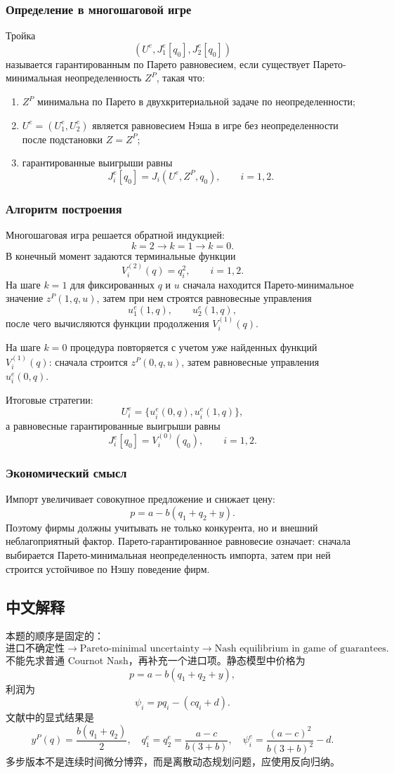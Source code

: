 \documentclass[12pt,a4paper]{article}
\begin{document}
\subsubsection{Определение в многошаговой игре}
Тройка
\[
(U^e,J_1^e[q_0],J_2^e[q_0])
\]
называется гарантированным по Парето равновесием, если существует Парето-минимальная неопределенность $Z^P$, такая что:
\begin{enumerate}
  \item $Z^P$ минимальна по Парето в двухкритериальной задаче по неопределенности;
  \item $U^e=(U_1^e,U_2^e)$ является равновесием Нэша в игре без неопределенности после подстановки $Z=Z^P$;
  \item гарантированные выигрыши равны
  \[
  J_i^e[q_0]=J_i(U^e,Z^P,q_0),\qquad i=1,2.
  \]
\end{enumerate}

\subsubsection{Алгоритм построения}
Многошаговая игра решается обратной индукцией:
\[
k=2\rightarrow k=1\rightarrow k=0.
\]
В конечный момент задаются терминальные функции
\[
V_i^{(2)}(q)=q_i^2,
\qquad i=1,2.
\]
На шаге $k=1$ для фиксированных $q$ и $u$ сначала находится Парето-минимальное значение $z^P(1,q,u)$, затем при нем строятся равновесные управления
\[
u_1^e(1,q),\qquad u_2^e(1,q),
\]
после чего вычисляются функции продолжения $V_i^{(1)}(q)$.

На шаге $k=0$ процедура повторяется с учетом уже найденных функций $V_i^{(1)}(q)$: сначала строится $z^P(0,q,u)$, затем равновесные управления $u_i^e(0,q)$.

Итоговые стратегии:
\[
U_i^e=\{u_i^e(0,q),u_i^e(1,q)\},
\]
а равновесные гарантированные выигрыши равны
\[
J_i^e[q_0]=V_i^{(0)}(q_0),\qquad i=1,2.
\]

\subsubsection{Экономический смысл}
Импорт увеличивает совокупное предложение и снижает цену:
\[
p=a-b(q_1+q_2+y).
\]
Поэтому фирмы должны учитывать не только конкурента, но и внешний неблагоприятный фактор. Парето-гарантированное равновесие означает: сначала выбирается Парето-минимальная неопределенность импорта, затем при ней строится устойчивое по Нэшу поведение фирм.

\subsection{中文解释}
本题的顺序是固定的：
\[
\text{进口不确定性} \rightarrow \text{Pareto-minimal uncertainty} \rightarrow \text{Nash equilibrium in game of guarantees}.
\]
不能先求普通 Cournot Nash，再补充一个进口项。静态模型中价格为
\[
p=a-b(q_1+q_2+y),
\]
利润为
\[
\psi_i=pq_i-(cq_i+d).
\]
文献中的显式结果是
\[
y^P(q)=\frac{b(q_1+q_2)}{2},\quad
q_1^e=q_2^e=\frac{a-c}{b(3+b)},\quad
\psi_i^e=\frac{(a-c)^2}{b(3+b)^2}-d.
\]
多步版本不是连续时间微分博弈，而是离散动态规划问题，应使用反向归纳。
\end{document}
